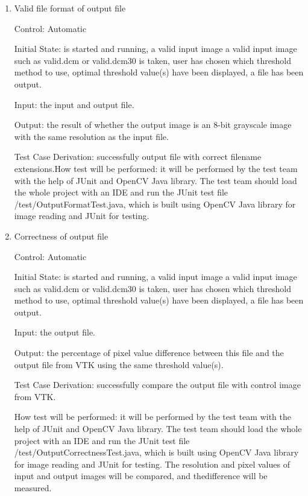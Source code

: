 \documentclass[12pt, titlepage]{article}
\begin{document}
\begin{enumerate}

\item{Valid file format of output file}

Control: Automatic
					
Initial State: \progname{} is started and running, a valid input image a valid
input image such as valid.dcm or valid.dcm30 is taken, user has chosen which
threshold method to use, optimal threshold value(s) have been displayed, a file
has been output.
					
Input: the input and output file.
					
Output: the result of whether the output image is an 8-bit grayscale image with
the same resolution as the input file.

Test Case Derivation: successfully output file with correct filename
extensions.How test will be performed: it will be performed by the test team
with the help
of JUnit and OpenCV Java library. The test team should load the whole project
with an IDE and run the JUnit test file /test/OutputFormatTest.java, which is
built using OpenCV Java library for image reading and JUnit for testing.

\item{Correctness of output file}


Control: Automatic
					
Initial State: \progname{} is started and running, a valid input image a valid
input image such as valid.dcm or valid.dcm30 is taken, user has chosen which
threshold method to use, optimal threshold value(s) have been displayed, a file
has been output.
					
Input: the output file.
					
Output: the percentage of pixel value difference between this file and the
output file from VTK using the same threshold value(s).

Test Case Derivation: successfully compare the output file with control image
from VTK.

How test will be performed: it will be performed by the test team with the help
of JUnit and OpenCV Java library. The test team should load the whole project
with an IDE and run the JUnit test file /test/OutputCorrectnessTest.java, which
is built using OpenCV Java library for image reading and JUnit for testing. The
resolution and pixel values of input and output images will be compared, and
thedifference will be measured.

\end{enumerate}
\end{document}
